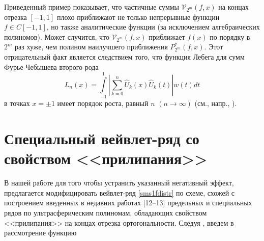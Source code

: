 Приведенный пример показывает, что частичные суммы $\mathcal{V}_{2^m}(f, x)$ на концах отрезка $[-1,1]$ плохо приближают не только непрерывные функции $f \in C[-1,1]$, но также аналитические функции (за исключением алгебраических полиномов).
Может случится, что $\mathcal{V}_{2^m}(f, x)$ приближает $f(x)$ по порядку в $2^m$ раз хуже, чем полином наилучшего приближения $P^{*}_{2^m}(f,x)$.
Этот отрицательный факт является следствием того, что функция Лебега для сумм Фурье-Чебышева второго рода
\begin{equation*}
L_{n}(x) = \int\limits_{-1}^{1}  \left|\sum\limits_{k=0}^{n}\hat U_{k}(x)\hat U_{k}(t)\right| w(t)dt
\end{equation*}
в точках $x = \pm1$ имеет порядок роста, равный $n$ $(n\to\infty)$ (см., напр., \cite{sms14}).

\section{Специальный вейвлет-ряд со свойством <<прилипания>>}

В нашей работе \cite{sms112} для того чтобы устранить указанный негативный эффект, предлагается модифицировать вейвлет-ряд \eqref{sms1fdistr} по схеме, схожей с построением введенных в недавних работах [12--13]
предельных и специальных рядов по ультрасферическим полиномам, обладающих свойством <<прилипания>> на концах отрезка ортогональности. Следуя \cite{sob-leg-sharap3},
введем в рассмотрение функцию

